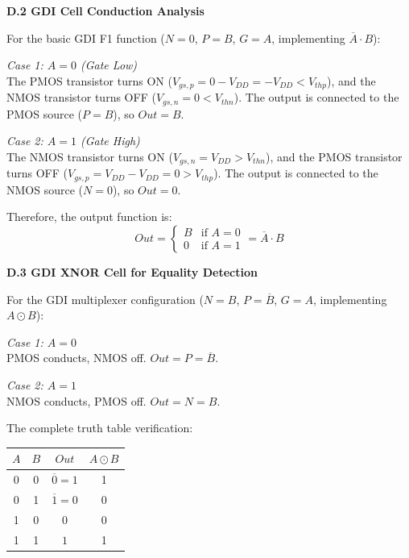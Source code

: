 \documentclass[12pt,a4paper,oneside]{report}
\begin{document}
\vspace{0.5cm}
\noindent\textbf{D.2 GDI Cell Conduction Analysis}

\noindent For the basic GDI F1 function ($N=0$, $P=B$, $G=A$, implementing $\overline{A} \cdot B$):

\noindent\textit{Case 1: $A = 0$ (Gate Low)}\\
The PMOS transistor turns ON ($V_{gs,p} = 0 - V_{DD} = -V_{DD} < V_{thp}$), and the NMOS transistor turns OFF ($V_{gs,n} = 0 < V_{thn}$). The output is connected to the PMOS source ($P = B$), so $Out = B$.

\noindent\textit{Case 2: $A = 1$ (Gate High)}\\
The NMOS transistor turns ON ($V_{gs,n} = V_{DD} > V_{thn}$), and the PMOS transistor turns OFF ($V_{gs,p} = V_{DD} - V_{DD} = 0 > V_{thp}$). The output is connected to the NMOS source ($N = 0$), so $Out = 0$.

\noindent Therefore, the output function is:
\begin{equation}
Out = \begin{cases} B & \text{if } A = 0 \\ 0 & \text{if } A = 1 \end{cases} = \overline{A} \cdot B
\end{equation}

\vspace{0.5cm}
\noindent\textbf{D.3 GDI XNOR Cell for Equality Detection}

\noindent For the GDI multiplexer configuration ($N=B$, $P=\overline{B}$, $G=A$, implementing $A \odot B$):

\noindent\textit{Case 1: $A = 0$}\\
PMOS conducts, NMOS off. $Out = P = \overline{B}$.

\noindent\textit{Case 2: $A = 1$}\\
NMOS conducts, PMOS off. $Out = N = B$.

\noindent The complete truth table verification:
\begin{center}
\begin{tabular}{|c|c|c|c|}
\hline
$A$ & $B$ & $Out$ & $A \odot B$ \\
\hline
0 & 0 & $\overline{0} = 1$ & 1 \\
\hline
0 & 1 & $\overline{1} = 0$ & 0 \\
\hline
1 & 0 & $0$ & 0 \\
\hline
1 & 1 & $1$ & 1 \\
\hline
\end{tabular}
\end{center}
\end{document}
